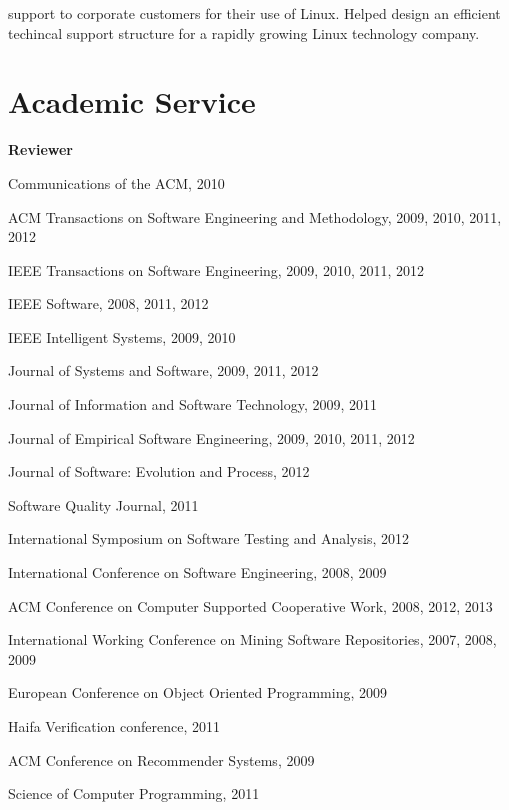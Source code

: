 \documentclass[margin,line,article,letterpaper]{res}
\newenvironment{list1}{
  \begin{list}{}{%
      \setlength{\itemsep}{0in}
      \setlength{\parsep}{0in} \setlength{\parskip}{0in}
      \setlength{\topsep}{0in} \setlength{\partopsep}{0in} 
      \setlength{\leftmargin}{0.17in}}}{\end{list}}
\begin{document}
\begin{resume}
\begin{list1}
support to corporate customers for their use of Linux. Helped design an efficient 
techincal support structure for a rapidly growing Linux technology company.
\end{list1}


\section{Academic \hspace{.2in} Service}
\textbf{Reviewer}
\begin{list1}
\item Communications of the ACM, 2010
\item ACM Transactions on Software Engineering and Methodology, 2009, 2010, 2011, 2012
\item IEEE Transactions on Software Engineering, 2009, 2010, 2011, 2012
\item IEEE Software, 2008, 2011, 2012
\item IEEE Intelligent Systems, 2009, 2010
\item Journal of Systems and Software, 2009, 2011, 2012
\item Journal of Information and Software Technology, 2009, 2011
\item Journal of Empirical Software Engineering, 2009, 2010, 2011, 2012
\item Journal of Software: Evolution and Process, 2012
\item Software Quality Journal, 2011
\item International Symposium on Software Testing and Analysis, 2012
\item International Conference on Software Engineering, 2008, 2009
\item ACM Conference on Computer Supported Cooperative Work, 2008, 2012, 2013
\item International Working Conference on Mining Software Repositories, 2007, 2008, 2009
\item European Conference on Object Oriented Programming, 2009
\item Haifa Verification conference, 2011
\item ACM Conference on Recommender Systems, 2009
\item Science of Computer Programming, 2011
\end{list1}


\end{resume}
\end{document}

